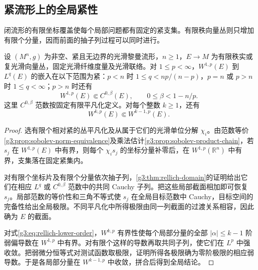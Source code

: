 \subsection{紧流形上的全局紧性}
\label{g3:subsec:1105:03}
闭流形的有限坐标覆盖使每个局部问题都有固定的紧支集。有限秩向量丛则只增加有限个分量，因而前面的抽子列过程可以同时进行。

\begin{theorem}\label{g3:thm:compact-bundle-rellich}
	设 \((M^n,g)\) 为非空、紧且无边界的光滑黎曼流形，\(n\ge1\)，\(E\to M\) 为有限秩实或复光滑向量丛，固定光滑纤维度量及光滑联络。对 \(1\le p<\infty\)，\(W^{1,p}(E)\) 到 \(L^q(E)\) 的嵌入在以下范围为紧：\(p<n\) 时 \(1\le q<np/(n-p)\)，\(p=n\) 或 \(p>n\) 时 \(1\le q<\infty\)；\(p>n\) 时还有
	\[
		W^{1,p}(E)\Subset C^{0,\beta}(E),\qquad0\le\beta<1-n/p.
	\]
	这里 \(C^{0,\beta}\) 范数按固定有限平凡化定义。对每个整数 \(k\ge1\)，还有
	\begin{equation}\label{g3:eq:rellich-lower-order}
		W^{k,p}(E)\Subset W^{k-1,p}(E).
	\end{equation}
\end{theorem}
\begin{proof}
	选有限个相对紧的丛平凡化及从属于它们的光滑单位分解 \(\chi_i\)。由范数等价\cref{g3:prop:sobolev-norm-equivalence}及乘法估计\cref{g3:prop:sobolev-product-chain}，若 \(s_j\) 在 \(W^{1,p}(E)\) 中有界，则每个 \(\chi_i s_j\) 的坐标分量补零后，在 \(W^{1,p}(\mathbb R^n)\) 中有界，支集落在固定紧集内。

	对有限个坐标片及有限个分量依次抽子列，\cref{g3:thm:rellich-domain}的证明给出它们在相应 \(L^q\) 或 \(C^{0,\beta}\) 范数中的共同 Cauchy 子列。把这些局部截面相加即可恢复 \(s_j\)。局部范数的等价性和三角不等式使 \(s_j\) 在全局目标范数中 Cauchy，目标空间的完备性给出全局极限。不同平凡化中所得极限由同一列截面的过渡关系相容，因此确为 \(E\) 的截面。

	对式\eqref{g3:eq:rellich-lower-order}，\(W^{k,p}\) 有界性使每个局部分量的全部 \(|\alpha|\le k-1\) 阶弱偏导数在 \(W^{1,p}\) 中有界。对有限个这样的导数再取共同子列，使它们在 \(L^p\) 中强收敛。把弱微分恒等式对测试函数取极限，证明所得各极限确为零阶极限的相应弱导数。于是各局部分量在 \(W^{k-1,p}\) 中收敛，拼合后得到全局结论。
\end{proof}

